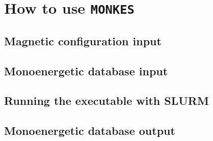 \section{How to use \texttt{MONKES}}


\subsection{Magnetic configuration input}


\subsection{Monoenergetic database input}



\subsection{Running the executable with SLURM}


\subsection{Monoenergetic database output}